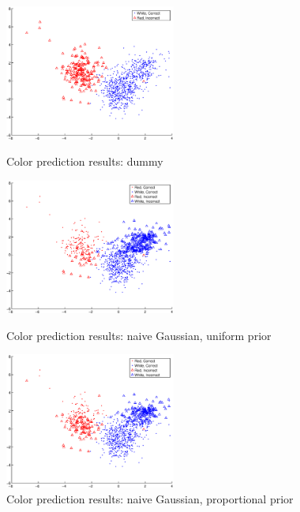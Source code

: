 \documentclass[twoside]{article}
\begin{document}
\begin{multicols}{2}
\begin{figure}[H]
\centering
\includegraphics[width=0.5\textwidth]{colorpca/dummy}
\caption{Color prediction results: dummy}
\includegraphics[width=0.5\textwidth]{colorpca/naive_noprior}
\caption{Color prediction results: naive Gaussian, uniform prior}
\includegraphics[width=0.5\textwidth]{colorpca/naive_prior}
\caption{Color prediction results: naive Gaussian, proportional prior}
\end{figure}



\end{multicols}
\end{document}
